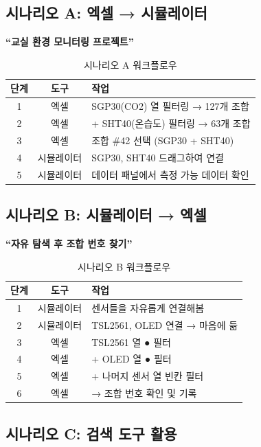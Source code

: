\documentclass[11pt,a4paper]{article}
\begin{document}
\subsection{시나리오 A: 엑셀 → 시뮬레이터}

\textbf{``교실 환경 모니터링 프로젝트''}

\begin{table}[H]
\centering
\begin{tabular}{|c|c|l|}
\hline
\rowcolor{tableheader}
\textbf{단계} & \textbf{도구} & \textbf{작업} \\
\hline
1 & 엑셀 & SGP30(CO2) 열 필터링 → 127개 조합 \\
\hline
2 & 엑셀 & + SHT40(온습도) 필터링 → 63개 조합 \\
\hline
3 & 엑셀 & 조합 \#42 선택 (SGP30 + SHT40) \\
\hline
4 & 시뮬레이터 & SGP30, SHT40 드래그하여 연결 \\
\hline
5 & 시뮬레이터 & 데이터 패널에서 측정 가능 데이터 확인 \\
\hline
\end{tabular}
\caption{시나리오 A 워크플로우}
\end{table}

\subsection{시나리오 B: 시뮬레이터 → 엑셀}

\textbf{``자유 탐색 후 조합 번호 찾기''}

\begin{table}[H]
\centering
\begin{tabular}{|c|c|l|}
\hline
\rowcolor{tableheader}
\textbf{단계} & \textbf{도구} & \textbf{작업} \\
\hline
1 & 시뮬레이터 & 센서들을 자유롭게 연결해봄 \\
\hline
2 & 시뮬레이터 & TSL2561, OLED 연결 → 마음에 듦 \\
\hline
3 & 엑셀 & TSL2561 열 ● 필터 \\
\hline
4 & 엑셀 & + OLED 열 ● 필터 \\
\hline
5 & 엑셀 & + 나머지 센서 열 빈칸 필터 \\
\hline
6 & 엑셀 & → 조합 번호 확인 및 기록 \\
\hline
\end{tabular}
\caption{시나리오 B 워크플로우}
\end{table}

\subsection{시나리오 C: 검색 도구 활용}
\end{document}
